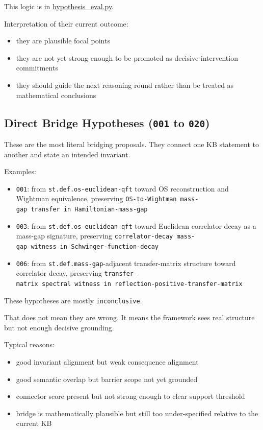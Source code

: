 \documentclass[
]{article}
\providecommand{\tightlist}{%
  \setlength{\itemsep}{0pt}\setlength{\parskip}{0pt}}
\begin{document}
This logic is in
\href{/Users/user/files/abducer/abducer/skills/common/hypothesis_eval.py:1079}{hypothesis\_eval.py}.

Interpretation of their current outcome:

\begin{itemize}
\tightlist
\item
  they are plausible focal points
\item
  they are not yet strong enough to be promoted as decisive intervention
  commitments
\item
  they should guide the next reasoning round rather than be treated as
  mathematical conclusions
\end{itemize}

\subsection{\texorpdfstring{Direct Bridge Hypotheses (\texttt{001} to
\texttt{020})}{Direct Bridge Hypotheses (001 to 020)}}\label{direct-bridge-hypotheses-001-to-020}

These are the most literal bridging proposals. They connect one KB
statement to another and state an intended invariant.

Examples:

\begin{itemize}
\tightlist
\item
  \texttt{001}: from \texttt{st.def.os-euclidean-qft} toward OS
  reconstruction and Wightman equivalence, preserving
  \texttt{OS-to-Wightman\ mass-gap\ transfer\ in\ Hamiltonian-mass-gap}
\item
  \texttt{003}: from \texttt{st.def.os-euclidean-qft} toward Euclidean
  correlator decay as a mass-gap signature, preserving
  \texttt{correlator-decay\ mass-gap\ witness\ in\ Schwinger-function-decay}
\item
  \texttt{006}: from \texttt{st.def.mass-gap}-adjacent transfer-matrix
  structure toward correlator decay, preserving
  \texttt{transfer-matrix\ spectral\ witness\ in\ reflection-positive-transfer-matrix}
\end{itemize}

These hypotheses are mostly \texttt{inconclusive}.

That does not mean they are wrong. It means the framework sees real
structure but not enough decisive grounding.

Typical reasons:

\begin{itemize}
\tightlist
\item
  good invariant alignment but weak consequence alignment
\item
  good semantic overlap but barrier scope not yet grounded
\item
  connector score present but not strong enough to clear support
  threshold
\item
  bridge is mathematically plausible but still too under-specified
  relative to the current KB
\end{itemize}
\end{document}
